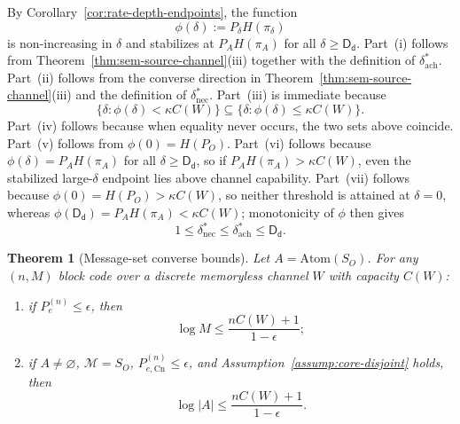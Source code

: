 \documentclass[journal,onecolumn]{IEEEtran}
\makeatletter
\newcommand{\Atom}{\text{Atom}}
\newcommand{\Cn}{\text{Cn}}
\newtheorem{theorem}{Theorem}[section]
\numberwithin{equation}{section}
\renewenvironment{proof}[1][\proofname]{\par
  \pushQED{\qed}%
  \normalfont \topsep6\p@\@plus6\p@\relax
  \trivlist
  \item[\hskip\labelsep
        \itshape
    #1\@addpunct{.}]\ignorespaces
}{%
  \popQED\endtrivlist\@endpefalse
}
\makeatother
\begin{document}
\begin{proof}
By Corollary~\ref{cor:rate-depth-endpoints}, the function
\[
  \phi(\delta):=P_\delta H(\pi_\delta)
\]
is non-increasing in \(\delta\) and stabilizes at
\(P_AH(\pi_A)\) for all \(\delta\ge \mathsf{D_d}\).
Part~\textup{(i)} follows from
Theorem~\ref{thm:sem-source-channel}\textup{(iii)} together with the
definition of \(\delta_{\mathrm{ach}}^*\).
Part~\textup{(ii)} follows from the converse direction in
Theorem~\ref{thm:sem-source-channel}\textup{(iii)} and the definition
of \(\delta_{\mathrm{nec}}^*\).
Part~\textup{(iii)} is immediate because
\[
  \{\delta:\phi(\delta)<\kappa C(W)\}
  \subseteq
  \{\delta:\phi(\delta)\le \kappa C(W)\}.
\]
Part~\textup{(iv)} follows because when equality never occurs, the two
sets above coincide.
Part~\textup{(v)} follows from
\(\phi(0)=H(P_O)\).
Part~\textup{(vi)} follows because
\(\phi(\delta)=P_AH(\pi_A)\) for all \(\delta\ge\mathsf{D_d}\), so if
\(P_AH(\pi_A)>\kappa C(W)\), even the stabilized large-\(\delta\)
endpoint lies above channel capability.
Part~\textup{(vii)} follows because
\(\phi(0)=H(P_O)>\kappa C(W)\), so neither threshold is attained at
\(\delta=0\), whereas
\(\phi(\mathsf{D_d})=P_AH(\pi_A)<\kappa C(W)\); monotonicity of
\(\phi\) then gives
\[
  1\le \delta_{\mathrm{nec}}^*
  \le \delta_{\mathrm{ach}}^*
  \le \mathsf{D_d}.
\]
\end{proof}

\begin{theorem}[Message-set converse bounds]
\label{thm:converse}
Let \(A=\Atom(S_O)\).
For any \((n,M)\) block code over a discrete memoryless channel
\(W\) with capacity \(C(W)\):
\begin{enumerate}[label=\textup{(\roman*)}]
  \item if \(P_e^{(n)}\le\epsilon\), then
        \begin{equation}\label{eq:classical-converse}
          \log M
          \le
          \frac{nC(W)+1}{1-\epsilon};
        \end{equation}
  \item if \(A\neq\varnothing\), \(\mathcal M=S_O\),
        \(P_{e,\Cn}^{(n)}\le\epsilon\), and
        Assumption~\textup{\ref{assump:core-disjoint}} holds, then
        \begin{equation}\label{eq:converse-closure}
          \log|A|
          \le
          \frac{nC(W)+1}{1-\epsilon}.
        \end{equation}
\end{enumerate}
\end{theorem}
\end{document}

